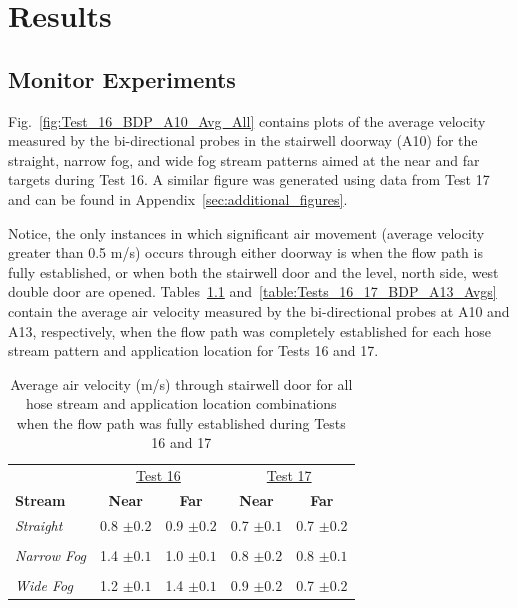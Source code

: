 \documentclass[12pt,oneside]{book}
\begin{document}

\chapter{Results}
\label{chap:Results}

\section{Monitor Experiments}
\label{sec:monitor_results}

Fig.~\ref{fig:Test_16_BDP_A10_Avg_All} contains plots of the average velocity measured by the bi-directional probes in the stairwell doorway (A10) for the straight, narrow fog, and wide fog stream patterns aimed at the near and far targets during Test 16. A similar figure was generated using data from Test 17 and can be found in Appendix~\ref{sec:additional_figures}.

Notice, the only instances in which significant air movement (average velocity greater than 0.5 m/s) occurs through either doorway is when the flow path is fully established, or when both the stairwell door and the  level, north side, west double door are opened. Tables~\ref{table:Tests_16_17_BDP_A10_Avgs} and~\ref{table:Tests_16_17_BDP_A13_Avgs} contain the average air velocity measured by the bi-directional probes at A10 and A13, respectively, when the flow path was completely established for each hose stream pattern and application location for Tests 16 and 17.

\begin{table}[!ht]
\caption{Average air velocity (m/s) through stairwell door for all hose stream and application location combinations when the flow path was fully established during Tests 16 and 17}
\begin{tabular}{lcccc}
\toprule
 & \multicolumn{2}{c}{\underline{Test 16}} & \multicolumn{2}{c}{\underline{Test 17}}
\\
\textbf{Stream} & \textbf{Near} & \textbf{Far} & \textbf{Near} & \textbf{Far} \\
\midrule
\textit{Straight} & 
0.8 $\pm 0.2$ & 0.9 $\pm 0.2$ & 
0.7 $\pm 0.1$ & 0.7 $\pm 0.2$
\\	\multicolumn{5}{c}{}	\\
\textit{Narrow Fog} & 
1.4 $\pm 0.1$ & 1.0 $\pm 0.1$ & 
0.8 $\pm 0.2$ & 0.8 $\pm 0.1 $          
\\	\multicolumn{5}{c}{}	\\
\textit{Wide Fog} 	& 
1.2 $\pm 0.1$ & 1.4 $\pm 0.1$ & 
0.9 $\pm 0.2$ & 0.7 $\pm 0.2$
\\
\bottomrule
\end{tabular}
\label{table:Tests_16_17_BDP_A10_Avgs}
\end{table}
\end{document}

